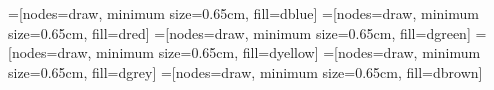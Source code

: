 \usepackage{xcolor}


=[{nodes={draw, minimum size=0.65cm, fill=dblue}}]
=[{nodes={draw, minimum size=0.65cm, fill=dred}}]
=[{nodes={draw, minimum size=0.65cm, fill=dgreen}}]
=[{nodes={draw, minimum size=0.65cm, fill=dyellow}}]
=[{nodes={draw, minimum size=0.65cm, fill=dgrey}}]
=[{nodes={draw, minimum size=0.65cm, fill=dbrown}}]
